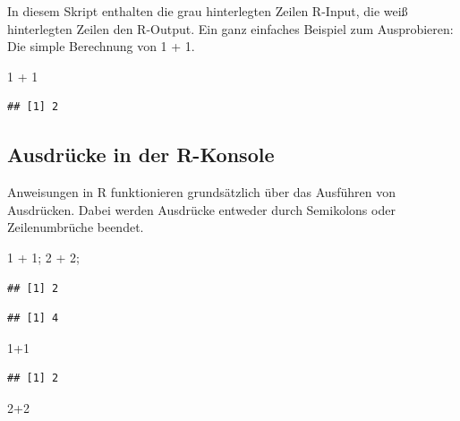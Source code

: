 \documentclass[
]{book}
\newenvironment{Shaded}{\begin{snugshade}}{\end{snugshade}}
\newcommand{\DecValTok}[1]{\textcolor[rgb]{0.00,0.00,0.81}{#1}}
\newcommand{\NormalTok}[1]{#1}
\newcommand{\SpecialCharTok}[1]{\textcolor[rgb]{0.00,0.00,0.00}{#1}}
\begin{document}
In diesem Skript enthalten die grau hinterlegten Zeilen R-Input, die weiß hinterlegten Zeilen den R-Output. Ein ganz einfaches Beispiel zum Ausprobieren: Die simple Berechnung von 1 + 1.

\begin{Shaded}
\begin{Highlighting}[]
\DecValTok{1} \SpecialCharTok{+} \DecValTok{1}
\end{Highlighting}
\end{Shaded}

\begin{verbatim}
## [1] 2
\end{verbatim}

\hypertarget{ausdruxfccke-in-der-r-konsole}{%
\subsection*{Ausdrücke in der R-Konsole}\label{ausdruxfccke-in-der-r-konsole}}

Anweisungen in R funktionieren grundsätzlich über das Ausführen von Ausdrücken. Dabei werden Ausdrücke entweder durch Semikolons oder Zeilenumbrüche beendet.

\begin{Shaded}
\begin{Highlighting}[]
\DecValTok{1} \SpecialCharTok{+} \DecValTok{1}\NormalTok{; }\DecValTok{2} \SpecialCharTok{+} \DecValTok{2}\NormalTok{;}
\end{Highlighting}
\end{Shaded}

\begin{verbatim}
## [1] 2
\end{verbatim}

\begin{verbatim}
## [1] 4
\end{verbatim}

\begin{Shaded}
\begin{Highlighting}[]
\DecValTok{1}\SpecialCharTok{+}\DecValTok{1}
\end{Highlighting}
\end{Shaded}

\begin{verbatim}
## [1] 2
\end{verbatim}

\begin{Shaded}
\begin{Highlighting}[]
\DecValTok{2}\SpecialCharTok{+}\DecValTok{2}
\end{Highlighting}
\end{Shaded}
\end{document}
